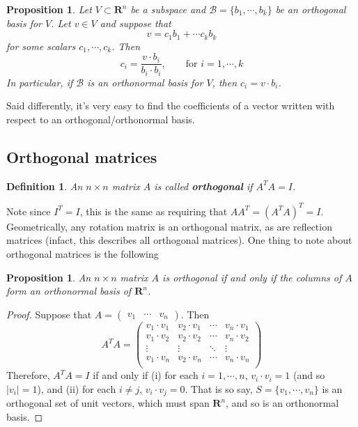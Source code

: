 \documentclass[12pt]{article}
\numberwithin{equation}{subsection}
\numberwithin{figure}{subsection}
\newtheorem{defn}[subsection]{Definition}
\newtheorem{prop}[subsection]{Proposition}
\theoremstyle{note}
\newcommand{\R}{\mathbf{R}}
\begin{document}
\begin{prop}
	Let $V\subset \R^n$ be a subspace and $\mathcal{B}=\{b_1,\cdots,b_k\}$ be an orthogonal basis for $V$. Let $v \in V$ and suppose that \[ v= c_1 b_1 + \cdots c_k b_k\] for some scalars $c_1,\cdots,c_k$. Then \begin{equation} 
		c_i = \dfrac{v\cdot b_i}{b_i \cdot b_i}, \qquad \text{for $i=1,\cdots,k$}
	\end{equation}
	In particular, if $\mathcal{B}$ is an orthonormal basis for $V$, then $c_i=v\cdot b_i$.
\end{prop}
Said differently, it's very easy to find the coefficients of a vector written with respect to an orthogonal/orthonormal basis. 

\subsection{Orthogonal matrices}

\begin{defn}
	An $n\times n$ matrix $A$ is called \textbf{orthogonal} if $A^TA=I$. 
\end{defn}

Note since $I^T=I$, this is the same as requiring that $AA^T=(A^TA)^T=I$. Geometrically, any rotation matrix is an orthogonal matrix, as are reflection matrices (infact, this describes all orthogonal matrices). One thing to note about orthogonal matrices is the following

\begin{prop} An $n\times n$ matrix $A$ is orthogonal if and only if the columns of $A$ form an orthonormal basis of $\R^n$. 
\end{prop}
\begin{proof}
	Suppose that $A=\begin{pmatrix} v_1 & \cdots & v_n\end{pmatrix}$. Then \[A^TA=\begin{pmatrix} 
	v_1 \cdot v_1 & v_2 \cdot v_1 & \cdots & v_n \cdot v_1 \\ 
	v_1 \cdot v_2 & v_2 \cdot v_2 & \cdots & v_n \cdot v_2 \\
	\vdots & \vdots & \ddots & \vdots \\
	v_1 \cdot v_n & v_2 \cdot v_n & \cdots & v_n \cdot v_n \\
	\end{pmatrix}\]
	Therefore, $A^TA=I$ if and only if (i) for each $i=1,\cdots,n$, $v_i\cdot v_i=1$ (and so $|v_i|=1$), and (ii) for each $i\neq j$, $v_i\cdot v_j=0$. That is so say, $S=\{v_1,\cdots,v_n\}$ is an orthogonal set of unit vectors, which must span $\R^n$, and so is an orthonormal basis.   
\end{proof}
\end{document}
